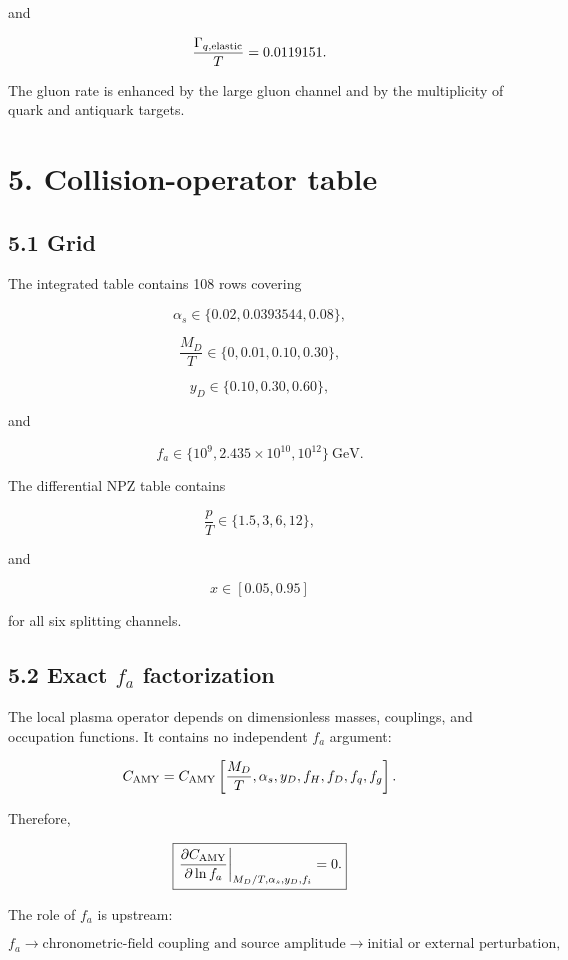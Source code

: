 \documentclass[
  10pt,
]{article}
\begin{document}
and

\[
\frac{\Gamma_{q,\rm elastic}}{T}=0.0119151.
\]

The gluon rate is enhanced by the large gluon channel and by the
multiplicity of quark and antiquark targets.

\section{5. Collision-operator table}\label{collision-operator-table}

\subsection{5.1 Grid}\label{grid}

The integrated table contains 108 rows covering

\[
\alpha_s
\in
\{0.02,0.0393544,0.08\},
\]

\[
\frac{M_D}{T}
\in
\{0,0.01,0.10,0.30\},
\]

\[
y_D
\in
\{0.10,0.30,0.60\},
\]

and

\[
f_a
\in
\{10^9,2.435\times10^{10},10^{12}\}\ \mathrm{GeV}.
\]

The differential NPZ table contains

\[
\frac{p}{T}
\in
\{1.5,3,6,12\},
\]

and

\[
x\in[0.05,0.95]
\]

for all six splitting channels.

\subsection{\texorpdfstring{5.2 Exact \(f_a\)
factorization}{5.2 Exact f\_a factorization}}\label{exact-f_a-factorization}

The local plasma operator depends on dimensionless masses, couplings,
and occupation functions. It contains no independent \(f_a\) argument:

\[
C_{\rm AMY}
=
C_{\rm AMY}
\left[
\frac{M_D}{T},
\alpha_s,
y_D,
f_H,f_D,f_q,f_g
\right].
\]

Therefore,

\[
\boxed{
\left.
\frac{\partial C_{\rm AMY}}
{\partial\ln f_a}
\right|_{M_D/T,\alpha_s,y_D,f_i}
=0.
}
\]

The role of \(f_a\) is upstream:

\[
f_a
\longrightarrow
\text{chronometric-field coupling and source amplitude}
\longrightarrow
\text{initial or external perturbation},
\]
\end{document}
